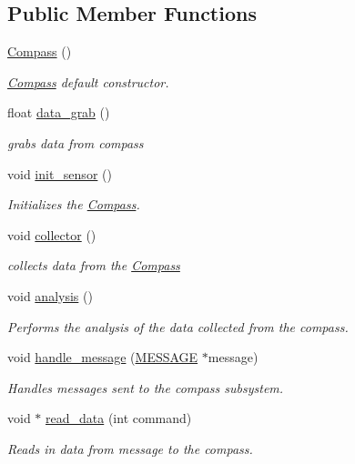 \subsection*{Public Member Functions}
\begin{DoxyCompactItemize}
\item 
\hyperlink{classCompass_a68bd2a073cc0d461b2b46529aae04765}{Compass} ()
\begin{DoxyCompactList}\small\item\em \hyperlink{classCompass}{Compass} default constructor. \end{DoxyCompactList}\item 
float \hyperlink{classCompass_aa4132c05a4e20e95633c72776385bc42}{data\-\_\-grab} ()
\begin{DoxyCompactList}\small\item\em grabs data from compass \end{DoxyCompactList}\item 
void \hyperlink{classCompass_a5cc2b71700af542b5aafadea4820a476}{init\-\_\-sensor} ()
\begin{DoxyCompactList}\small\item\em Initializes the \hyperlink{classCompass}{Compass}. \end{DoxyCompactList}\item 
void \hyperlink{classCompass_ae8d7f3417a27b1d18487b96ca07dd32b}{collector} ()
\begin{DoxyCompactList}\small\item\em collects data from the \hyperlink{classCompass}{Compass} \end{DoxyCompactList}\item 
void \hyperlink{classCompass_a4dd6402d0ece9203c6b92670265b4c8d}{analysis} ()
\begin{DoxyCompactList}\small\item\em Performs the analysis of the data collected from the compass. \end{DoxyCompactList}\item 
void \hyperlink{classCompass_a1fb0f64b335e8f1d4f27dc2067312b4a}{handle\-\_\-message} (\hyperlink{SUBSYS__COMMANDS_8h_ad814416fc1a8c675bea2687d96088a8f}{M\-E\-S\-S\-A\-G\-E} $\ast$message)
\begin{DoxyCompactList}\small\item\em Handles messages sent to the compass subsystem. \end{DoxyCompactList}\item 
void $\ast$ \hyperlink{classCompass_ab55d084e2d643df0a1970f5868d0c5a8}{read\-\_\-data} (int command)
\begin{DoxyCompactList}\small\item\em Reads in data from message to the compass. \end{DoxyCompactList}\end{DoxyCompactItemize}
